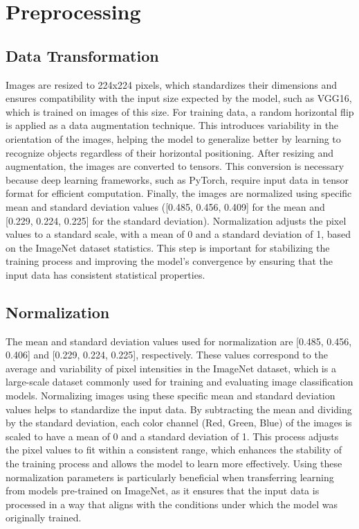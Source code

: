 \documentclass[a4paper,oneside,11pt]{book}
\begin{document}
\section{Preprocessing}
\subsection{Data Transformation}
Images are resized to 224x224 pixels, which standardizes their dimensions and ensures compatibility with the input size expected by the model, such as VGG16, which is trained on images of this size. For training data, a random horizontal flip is applied as a data augmentation technique. This introduces variability in the orientation of the images, helping the model to generalize better by learning to recognize objects regardless of their horizontal positioning. After resizing and augmentation, the images are converted to tensors. This conversion is necessary because deep learning frameworks, such as PyTorch, require input data in tensor format for efficient computation. Finally, the images are normalized using specific mean and standard deviation values ([0.485, 0.456, 0.409] for the mean and [0.229, 0.224, 0.225] for the standard deviation). Normalization adjusts the pixel values to a standard scale, with a mean of 0 and a standard deviation of 1, based on the ImageNet dataset statistics. This step is important for stabilizing the training process and improving the model's convergence by ensuring that the input data has consistent statistical properties.
\subsection{Normalization}
The mean and standard deviation values used for normalization are [0.485, 0.456, 0.406] and [0.229, 0.224, 0.225], respectively. These values correspond to the average and variability of pixel intensities in the ImageNet dataset, which is a large-scale dataset commonly used for training and evaluating image classification models. Normalizing images using these specific mean and standard deviation values helps to standardize the input data. By subtracting the mean and dividing by the standard deviation, each color channel (Red, Green, Blue) of the images is scaled to have a mean of 0 and a standard deviation of 1. This process adjusts the pixel values to fit within a consistent range, which enhances the stability of the training process and allows the model to learn more effectively. Using these normalization parameters is particularly beneficial when transferring learning from models pre-trained on ImageNet, as it ensures that the input data is processed in a way that aligns with the conditions under which the model was originally trained.
\pagestyle{plain}
\end{document}
